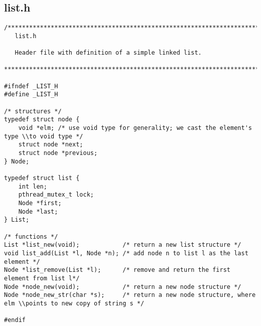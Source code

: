 \subsection{list.h}
\begin{lstlisting}
/******************************************************************************
   list.h 

   Header file with definition of a simple linked list.

******************************************************************************/

#ifndef _LIST_H
#define _LIST_H

/* structures */
typedef struct node {
	void *elm; /* use void type for generality; we cast the element's type \\to void type */
	struct node *next;
	struct node *previous;
} Node;

typedef struct list {
	int len;
	pthread_mutex_t lock;
	Node *first;
	Node *last;
} List;

/* functions */
List *list_new(void);            /* return a new list structure */
void list_add(List *l, Node *n); /* add node n to list l as the last element */
Node *list_remove(List *l);      /* remove and return the first element from list l*/
Node *node_new(void);            /* return a new node structure */
Node *node_new_str(char *s);     /* return a new node structure, where elm \\points to new copy of string s */

#endif
\end{lstlisting}